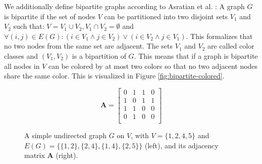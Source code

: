 We additionally define bipartite graphs according to Asratian et al. \cite{asratian1998}: A graph $G$ is bipartite if the set of nodes $V$ can be partitioned into two disjoint sets $V_1$ and $V_2$ such that: $V = V_1 \cup V_2, V_1 \cap V_2 = \emptyset$ and $\forall (i,j) \in E(G): (i \in V_1 \land j \in V_2) \lor (i \in V_2 \land j \in V_1)$. This formalizes that no two nodes from the same set are adjacent. The sets $V_1$ and $V_2$ are called color classes and $(V_1, V_2)$ is a bipartition of $G$. This means that if a graph is bipartite all nodes in $V$ can be colored by at most two colors so that no two adjacent nodes share the same color. This is visualized in Figure \ref{fig:bipartite-colored}. \bigskip
\begin{figure}[h]
    \centering
    \begin{minipage}{0.5\textwidth}
        \centering
    \end{minipage}%
    \begin{minipage}{0.45\textwidth}
        \vspace*{0.1cm} %
        \[
        \mathbf{A} = \begin{bmatrix}
            0 & 1 & 1 & 0 \\
            1 & 0 & 1 & 1 \\
            1 & 1 & 0 & 0 \\
            0 & 1 & 0 & 0 \\
        \end{bmatrix}
        \]
    \end{minipage}
    \caption[Example of an undirected graph]{A simple undirected graph $G$ on $V$, with $V=\{1,2,4,5\}$ and $E(G)=\{\{1,2\},\{2,4\},\{1,4\},\{2,5\}\}$ (left), and its adjacency matrix $\mathbf{A}$ (right).}
    \label{fig:graph-example}
\end{figure}

